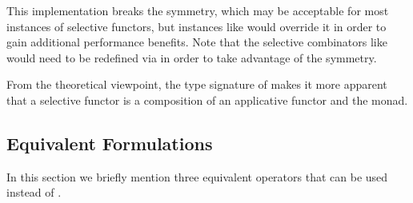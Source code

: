 \noindent
This implementation breaks the symmetry, which may be acceptable for most
instances of selective functors, but instances like  would override it
in order to gain additional performance benefits. Note that the selective
combinators like \hs{<||>} would need to be redefined via  in order
to take advantage of the symmetry.

From the theoretical viewpoint, the type signature of  makes it
more apparent that a selective functor  is a composition of an applicative
functor  and the  monad.

\subsection{Equivalent Formulations}\label{sec-alt-equivalent}

In this section we briefly mention three equivalent operators that can be used
instead of .

